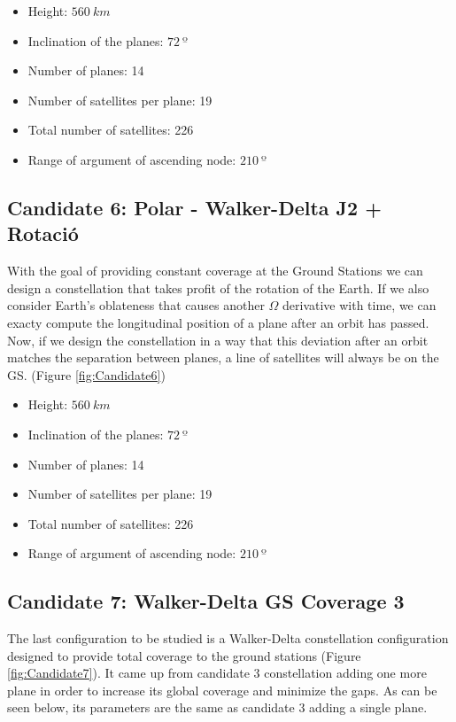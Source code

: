 \begin{itemize}
	\item Height: $560~{km}$ 
	\item Inclination of the planes: $72~{º}$  
	\item Number of planes: 14
	\item Number of satellites per plane: 19
	\item Total number of satellites: 226
	\item Range of argument of ascending node: $210~{º}$
\end{itemize}

\subsection{Candidate 6: Polar - Walker-Delta J2 + Rotació}

With the goal of providing constant coverage at the Ground Stations we can design a constellation that takes profit of the rotation of the Earth. If we also consider Earth's oblateness that causes another $\Omega$ derivative with time, we can exacty compute the longitudinal position of a plane after an orbit has passed. Now, if we design the constellation in a way that this deviation after an orbit matches the separation between planes, a line of satellites will always be on the GS. (Figure \ref{fig:Candidate6})

\begin{itemize}
\item Height: $560~{km}$ 
\item Inclination of the planes: $72~{º}$  
\item Number of planes: 14
\item Number of satellites per plane: 19
\item Total number of satellites: 226
\item Range of argument of ascending node: $210~{º}$
\end{itemize}

\subsection{Candidate 7: Walker-Delta GS Coverage 3}

The last configuration to be studied is a Walker-Delta constellation configuration designed to provide total coverage to the ground stations (Figure \ref{fig:Candidate7}). It came up from candidate 3 constellation adding one more plane in order to increase its global coverage and minimize the gaps. As can be seen below, its parameters are the same as candidate 3 adding a single plane.

